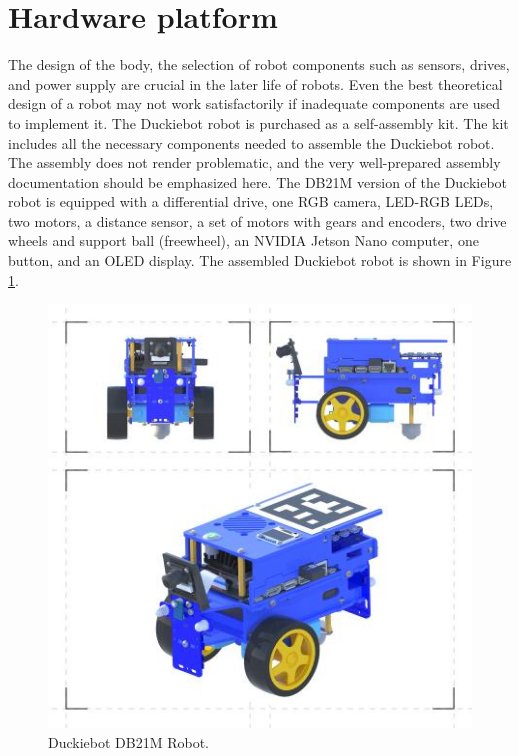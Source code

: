 \documentclass[conference]{IEEEtran}
\begin{document}
\section{Hardware platform}\label{sec:hardware}
The design of the body, the selection of robot components such as sensors, drives, and power supply are crucial in the later life of robots. Even the best theoretical design of a robot may not work satisfactorily if inadequate components are used to implement it. 
The Duckiebot robot is purchased as a self-assembly kit. The kit includes all the necessary components needed to assemble the Duckiebot robot. The assembly does not render problematic, and the very well-prepared assembly documentation should be emphasized here. The DB21M version of the Duckiebot robot is equipped with a differential drive, one RGB camera, LED-RGB LEDs, two motors, a distance sensor, a set of motors with gears and encoders, two drive wheels and support ball (freewheel), an NVIDIA Jetson Nano computer, one button, and an OLED display. The assembled Duckiebot robot is shown in Figure \ref{fig:robot-duckiebot}.

\begin{figure}
    \centering
    \includegraphics[width=1.0\columnwidth]{d3.jpg}
    \caption{Duckiebot DB21M Robot.}
    \label{fig:robot-duckiebot}
\end{figure}
\end{document}
